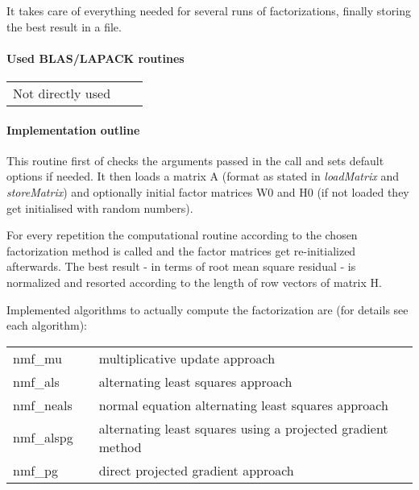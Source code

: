 \documentclass[a4paper,10pt]{scrartcl}
\begin{document}
					It takes care of everything needed for several runs of
					factorizations, finally storing the best result in a file.\newline
 		
			\paragraph{Used BLAS/LAPACK routines}

					\begin{tabular}{lcl}
						Not directly used && \\
					\end{tabular}

			\paragraph{Implementation outline}
			

					This routine first of checks the arguments passed in the call and sets
					default options if needed.
					It then loads a matrix A (format as stated in \emph{loadMatrix} and
					 \emph{storeMatrix}) and optionally initial factor matrices W0 and H0 (if 
					not loaded they get initialised with random numbers).
					\newline



					For every repetition the computational routine according to the chosen
					factorization method is called and the factor matrices get re-initialized
					afterwards. The best result - in terms of root mean
					square residual - is normalized and resorted according to the length of
					row vectors of matrix H.
					\newline


					Implemented algorithms to actually compute the factorization are (for 
					details see each algorithm):
 					\newline


					\begin{tabular}{lcl}
 					nmf\_mu	&& multiplicative update approach\\
 					nmf\_als && alternating least squares approach\\
 					nmf\_neals && normal equation alternating least squares approach\\
 					nmf\_alspg && alternating least squares using a projected 
							gradient method\\
					nmf\_pg && direct projected gradient approach\\
					\end{tabular}
\end{document}
